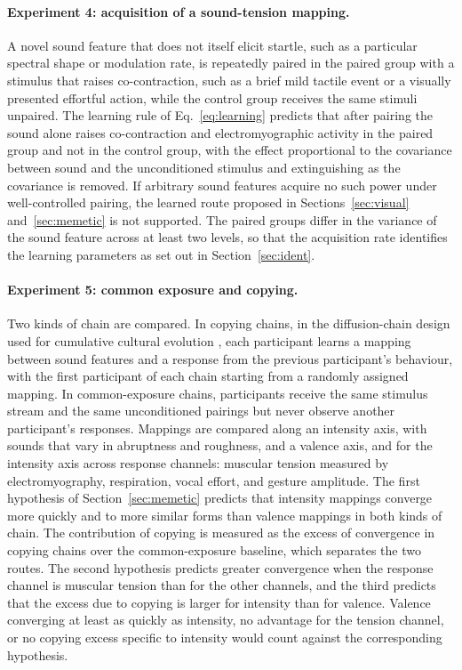 \documentclass[11pt]{article}
\theoremstyle{plain}
\theoremstyle{definition}
\begin{document}
\paragraph{Experiment 4: acquisition of a sound-tension mapping.}
A novel sound feature that does not itself elicit startle, such as a particular spectral shape or modulation rate, is repeatedly paired in the paired group with a stimulus that raises co-contraction, such as a brief mild tactile event or a visually presented effortful action, while the control group receives the same stimuli unpaired. The learning rule of Eq.~\eqref{eq:learning} predicts that after pairing the sound alone raises co-contraction and electromyographic activity in the paired group and not in the control group, with the effect proportional to the covariance between sound and the unconditioned stimulus and extinguishing as the covariance is removed. If arbitrary sound features acquire no such power under well-controlled pairing, the learned route proposed in Sections~\ref{sec:visual} and~\ref{sec:memetic} is not supported. The paired groups differ in the variance of the sound feature across at least two levels, so that the acquisition rate identifies the learning parameters as set out in Section~\ref{sec:ident}.

\paragraph{Experiment 5: common exposure and copying.}
Two kinds of chain are compared. In copying chains, in the diffusion-chain design used for cumulative cultural evolution \citep{kirby2008}, each participant learns a mapping between sound features and a response from the previous participant's behaviour, with the first participant of each chain starting from a randomly assigned mapping. In common-exposure chains, participants receive the same stimulus stream and the same unconditioned pairings but never observe another participant's responses. Mappings are compared along an intensity axis, with sounds that vary in abruptness and roughness, and a valence axis, and for the intensity axis across response channels: muscular tension measured by electromyography, respiration, vocal effort, and gesture amplitude. The first hypothesis of Section~\ref{sec:memetic} predicts that intensity mappings converge more quickly and to more similar forms than valence mappings in both kinds of chain. The contribution of copying is measured as the excess of convergence in copying chains over the common-exposure baseline, which separates the two routes. The second hypothesis predicts greater convergence when the response channel is muscular tension than for the other channels, and the third predicts that the excess due to copying is larger for intensity than for valence. Valence converging at least as quickly as intensity, no advantage for the tension channel, or no copying excess specific to intensity would count against the corresponding hypothesis.
\end{document}
